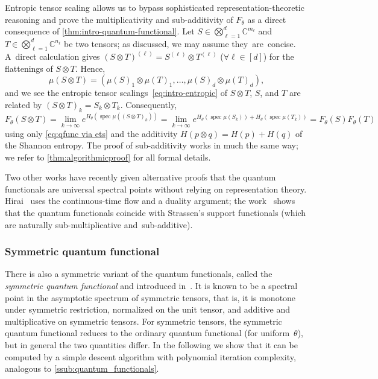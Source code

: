 \documentclass[11pt,letterpaper]{article}
\numberwithin{equation}{section}
\newcommand{\CC}{\mathbb{C}}
\newcommand{\qfunc}{F}
\DeclareMathOperator{\spec}{spec}
\begin{document}
Entropic tensor scaling allows us to bypass sophisticated representation-theoretic reasoning and prove the multiplicativity and sub-additivity of $F_{\theta}$ as a direct consequence of \cref{thm:intro-quantum-functional}.
Let $S\in\bigotimes_{\ell=1}^{d} \CC^{m_\ell}$ and $T\in\bigotimes_{\ell=1}^d \CC^{n_\ell}$ be two tensors; as discussed, we may assume they~are~concise.
A~direct calculation gives $(S\otimes T)^{(\ell)} = S^{(\ell)}\otimes T^{(\ell)}$ ($\forall \ell\in [d]$) for the flattenings of $S\otimes T$.
Hence,
\[
\mu(S\otimes T) = \left( \mu(S)_1 \otimes \mu(T)_1 , \dots,\mu(S)_d \otimes \mu(T)_d \right),
\]
and we see the entropic tensor scalings~\eqref{eq:intro-entropic} of $S\otimes T$, $S$, and $T$ are related by $(S\otimes T)_{k}=S_k\otimes T_k$.
Consequently,
\[
    \qfunc_\theta(S\otimes T)
= \lim_{k\rightarrow\infty} e^{H_\theta\left(\spec\mu\left( (S\otimes T)_{k} \right)\right)}
= \lim_{k\rightarrow\infty} e^{H_\theta\left(\spec\mu\left( S_{k} \right)\right)+H_\theta\left(\spec\mu\left( T_{k} \right)\right)}
= \qfunc_\theta(S) \qfunc_\theta(T)
\]
using only \cref{eq:qfunc via ets} and the additivity $H(p\otimes q)=H(p)+H(q)$ of the Shannon entropy.
The proof of sub-additivity works in much the same way; we refer to \cref{thm:algorithmicproof} for all formal details.

Two other works have recently given alternative proofs that the quantum functionals are universal spectral points without relying on representation theory.
Hirai~\cite{Hirai2025} uses the continuous-time flow and a duality argument; the work~\cite{SDW2026} shows that the quantum functionals coincide with Strassen's support functionals (which are naturally sub-multiplicative and~sub-additive).

\subsubsection{Symmetric quantum functional}
There is also a symmetric variant of the quantum functionals, called the \emph{symmetric quantum functional} and introduced in~\cite{CFTZ-22}.
It is known to be a spectral point in the asymptotic spectrum of symmetric tensors, that is, it is monotone under symmetric restriction, normalized on the unit tensor, and additive and multiplicative on symmetric tensors.
For symmetric tensors, the symmetric quantum functional reduces to the ordinary quantum functional (for uniform~$\theta$), but in general the two quantities differ.
In the following we show that it can be computed by a simple descent algorithm with polynomial iteration complexity, analogous to \cref{ssub:quantum_functionals}.
\end{document}
